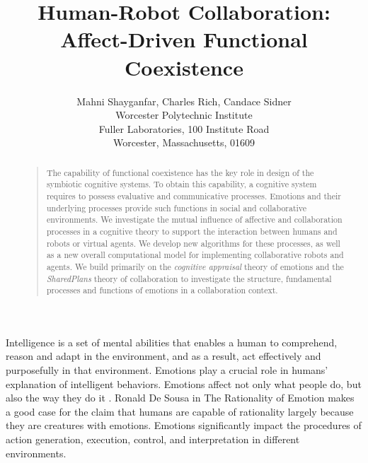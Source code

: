 \documentclass[letterpaper]{article}
\begin{document}
%
\title{Human-Robot Collaboration: Affect-Driven Functional Coexistence}
\author{Mahni Shayganfar, Charles Rich, Candace Sidner\\
Worcester Polytechnic Institute\\
Fuller Laboratories, 100 Institute Road\\
Worcester, Massachusetts, 01609\\
}
\maketitle
\begin{abstract}
\begin{quote}
The capability of functional coexistence has the key role in design of
the symbiotic cognitive systems. To obtain this capability, a cognitive system
requires to possess evaluative and communicative processes. Emotions and
their underlying processes provide such functions in social and collaborative
environments. We investigate the mutual influence of affective and collaboration
processes in a cognitive theory to support the interaction between humans and
robots or virtual agents. We develop new algorithms for these processes, as well
as a new overall computational model for implementing collaborative robots and
agents. We build primarily on the \textit{cognitive appraisal} theory of
emotions and the \textit{SharedPlans} theory of collaboration to investigate the
structure, fundamental processes and functions of emotions in a collaboration
context.
\end{quote}
\end{abstract}

Intelligence is a set of mental abilities that enables a human to comprehend,
reason and adapt in the environment, and as a result, act effectively and
purposefully in that environment. Emotions play a crucial role in humans'
explanation of intelligent behaviors. Emotions affect not only what people do,
but also the way they do it \cite{cowie:concepts-definitions}. Ronald De Sousa
in The Rationality of Emotion \cite{sousa:rationality-emotion} makes a good case
for the claim that humans are capable of rationality largely because they are
creatures with emotions. Emotions significantly impact the procedures of action
generation, execution, control, and interpretation \cite{zhu:emotion-action} in
different environments. 
\end{document}
